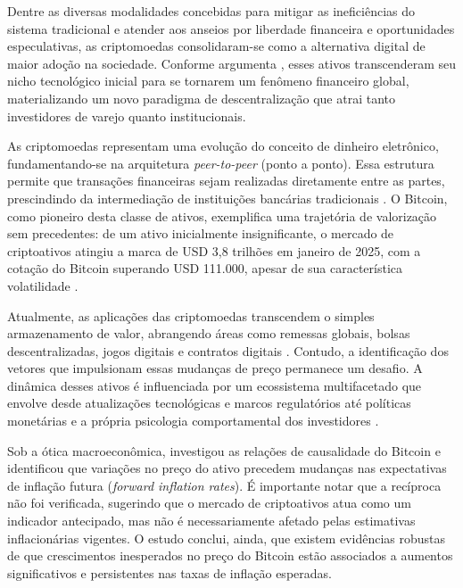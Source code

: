 \documentclass[
    12pt,                %
    openright,           %
    oneside,             %
    a4paper,             %
    english,             %
    brazil               %
]{abntex2}
\begin{document}
Dentre as diversas modalidades concebidas para mitigar as ineficiências do sistema tradicional e 
atender aos anseios por liberdade financeira e oportunidades especulativas, as criptomoedas 
consolidaram-se como a alternativa digital de maior adoção na sociedade. Conforme argumenta 
, esses ativos transcenderam seu nicho tecnológico inicial para se tornarem 
um fenômeno financeiro global, materializando um novo paradigma de descentralização que atrai tanto investidores de varejo 
quanto institucionais.

As criptomoedas representam uma evolução do conceito de dinheiro eletrônico, fundamentando-se na arquitetura \textit{peer-to-peer} (ponto a ponto). 
Essa estrutura permite que transações financeiras sejam realizadas diretamente entre as partes, prescindindo da intermediação de instituições bancárias 
tradicionais \cite{CHUEN}. O Bitcoin, como pioneiro desta classe de ativos, exemplifica uma trajetória de valorização sem precedentes: de um ativo inicialmente 
insignificante, o mercado de criptoativos atingiu a marca de USD 3,8 trilhões em janeiro de 2025, com a cotação do Bitcoin superando USD 111.000, apesar de sua 
característica volatilidade \cite{CHEN}.

Atualmente, as aplicações das criptomoedas transcendem o simples armazenamento de valor, abrangendo áreas como remessas globais, bolsas descentralizadas, 
jogos digitais e contratos digitais \cite{CHUEN}. Contudo, a identificação dos vetores que impulsionam essas mudanças de preço permanece um desafio. 
A dinâmica desses ativos é influenciada por um ecossistema multifacetado que envolve desde atualizações tecnológicas e marcos regulatórios até políticas 
monetárias e a própria psicologia comportamental dos investidores \cite{CHEN}. 

Sob a ótica macroeconômica,  investigou as relações de causalidade do Bitcoin e identificou que variações no preço do ativo precedem 
mudanças nas expectativas de inflação futura (\textit{forward inflation rates}). É importante notar que a recíproca não foi verificada, sugerindo que o mercado 
de criptoativos atua como um indicador antecipado, mas não é necessariamente afetado pelas estimativas inflacionárias vigentes. O estudo conclui, ainda, que 
existem evidências robustas de que crescimentos inesperados no preço do Bitcoin estão associados a aumentos significativos e persistentes nas taxas de inflação 
esperadas.
\end{document}
